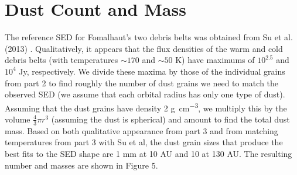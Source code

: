 \documentclass[12pt]{article}
\begin{document}
\section{Dust Count and Mass}

The reference SED for Fomalhaut's two debris belts was obtained from Su et al. (2013) \cite{sed}. Qualitatively, it appears that the flux densities of the warm and cold debris belts (with temperatures $\sim170$ and $\sim50$ K) have maximums of $10^{2.5}$ and $10^{4}$ Jy, respectively. We divide these maxima by those of the individual grains from part 2 to find roughly the number of dust grains we need to match the observed SED (we assume that each orbital radius has only one type of dust). Assuming that the dust grains have density 2 \si{\gram\per\cubic\centi\meter}, we multiply this by the volume $\frac{4}{3}\pi{r}^{3}$ (assuming the dust is spherical) and amount to find the total dust mass. Based on both qualitative appearance from part 3 and from matching temperatures from part 3 with Su et al, the dust grain sizes that produce the best fits to the SED shape are 1 mm at 10 AU and 10 \si{\micro} at 130 AU. The resulting number and masses are shown in Figure 5.
\end{document}
